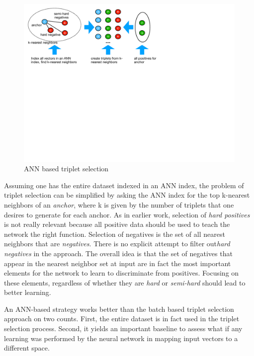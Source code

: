 \begin{figure}
\includegraphics[width=1.0\linewidth]{ANN_selection}
\caption{ANN based triplet selection}
\label{ANN_selection}
\end{figure}

Assuming one has the entire dataset indexed in an ANN index, the problem of triplet selection can be simplified by asking the ANN index for the top k-nearest neighbors of an \textit{anchor}, where k is given by the number of triplets that one desires to generate for each anchor.  As in earlier work, selection of \textit{hard positives} is not really relevant because all positive data should be used to teach the network the right function.  Selection of negatives is the set of all nearest neighbors that are \textit{negatives}.  There is no explicit attempt to filter out\textit{hard negatives} in the approach.  The overall idea is that the set of negatives that appear in the nearest neighbor set at input are in fact the most important elements for the network to learn to discriminate from positives.  Focusing on these elements, regardless of whether they are \textit{hard} or \textit{semi-hard} should lead to better learning.

An ANN-based strategy works better than the batch based triplet selection approach on two counts.  First, the entire dataset is in fact used in the triplet selection process.  Second, it yields an important baseline to assess what if any learning was performed by the neural network in mapping input vectors to a different space.
